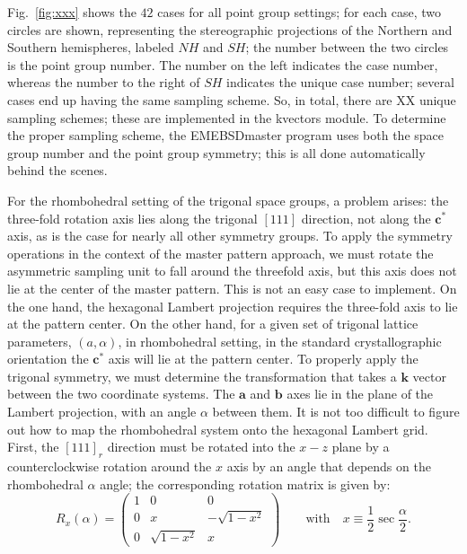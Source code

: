 \documentclass[DIV=calc, paper=letter, fontsize=11pt]{scrartcl}	 %
\begin{document}
Fig.~\ref{fig:xxx} shows the $42$ cases for all point group settings; for each case, two circles are shown, representing the 
stereographic projections of the Northern and Southern hemispheres, labeled $NH$ and $SH$; the number between the two
circles is the point group number.  The number on the left indicates the case number, whereas the number to the right of $SH$
indicates the unique case number; several cases end up having the same sampling scheme.  So, in total, there are XX unique
sampling schemes; these are implemented in the \textsf{kvectors} module.  To determine the proper sampling scheme, the 
\textsf{EMEBSDmaster} program uses both the space group number and the point group symmetry; this is all done automatically
behind the scenes.  

For the rhombohedral setting of the trigonal space groups, a problem arises: the three-fold rotation axis lies along the 
trigonal $[111]$ direction, not along the $\mathbf{c}^{\ast}$ axis, as is the case for nearly all other symmetry groups. To apply the 
symmetry operations in the context of the master pattern approach, we must rotate the asymmetric sampling unit to fall 
around the threefold axis, but this axis does not lie at the center of the master pattern. This is not an easy case to implement.
On the one hand, the hexagonal Lambert projection requires the three-fold axis to lie at the pattern center. On the other hand,
for a given set of trigonal lattice parameters, $(a,\alpha)$, in rhombohedral setting, in the standard crystallographic orientation
the $\mathbf{c}^{\ast}$ axis will lie at the pattern center.  To properly apply the trigonal symmetry, we must determine the 
transformation that takes a $\mathbf{k}$ vector between the two coordinate systems.  The $\mathbf{a}$ and $\mathbf{b}$ axes
lie in the plane of the Lambert projection, with an angle $\alpha$ between them.  It is not too difficult to figure out how to
map the rhombohedral system onto the hexagonal Lambert grid.  First, the $[111]_r$ direction must be rotated into the $x-z$
plane by a counterclockwise rotation around the $x$ axis by an angle that depends on the rhombohedral $\alpha$ angle; the 
corresponding rotation matrix is given by:
\begin{equation}
	R_x(\alpha) = \left(\begin{array}{ccc}
	1 & 0 & 0\\
	0 & x & -\sqrt{1-x^2}\\
	0 & \sqrt{1-x^2} & x\end{array}\right)\qquad\text{with}\quad x\equiv\frac{1}{2}\sec\frac{\alpha}{2}.
\end{equation}
\end{document}
